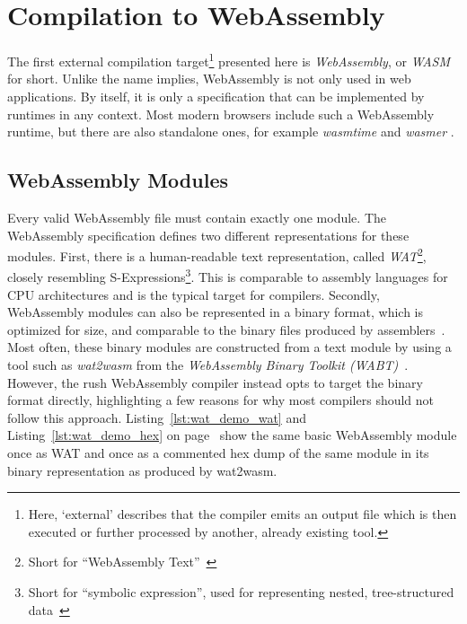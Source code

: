 \section{Compilation to WebAssembly}\label{sec:wasm}

The first external compilation target\footnote{Here, `external' describes that the compiler emits an output file which is then executed or further processed by another, already existing tool.} presented here is \emph{WebAssembly}, or \emph{WASM} for short.
Unlike the name implies, WebAssembly is not only used in web applications.
By itself, it is only a specification that can be implemented by runtimes in any context.
Most modern browsers include such a WebAssembly runtime, but there are also standalone ones, for example \emph{wasmtime} and \emph{wasmer} .

\subsection{WebAssembly Modules}

Every valid WebAssembly file must contain exactly one module.
The WebAssembly specification defines two different representations for these modules.
First, there is a human-readable text representation, called \emph{WAT}\footnote{Short for \enquote{WebAssembly Text}~\cite[p.~40]{Sendil2022-fy}}, closely resembling S-Expressions\footnote{Short for \enquote{symbolic expression}, used for representing  nested, tree-structured data~\cite[p.~41]{Sendil2022-fy}}.
This is comparable to assembly languages for CPU architectures and is the typical target for compilers.
Secondly, WebAssembly modules can also be represented in a binary format, which is optimized for size, and comparable to the binary files produced by assemblers~\cite[pp.~40--44]{Sendil2022-fy}.
Most often, these binary modules are constructed from a text module by using a tool such as \emph{wat2wasm} from the \emph{WebAssembly Binary Toolkit (WABT)}~\cite[p.~57]{Sendil2022-fy}.
However, the rush WebAssembly compiler instead opts to target the binary format directly, highlighting a few reasons for why most compilers should not follow this approach.
Listing~\ref{lst:wat_demo_wat} and Listing~\ref{lst:wat_demo_hex} on page~\pageref{lst:wat_demo_wat} show the same basic WebAssembly module once as WAT and once as a commented hex dump of the same module in its binary representation as produced by wat2wasm.

